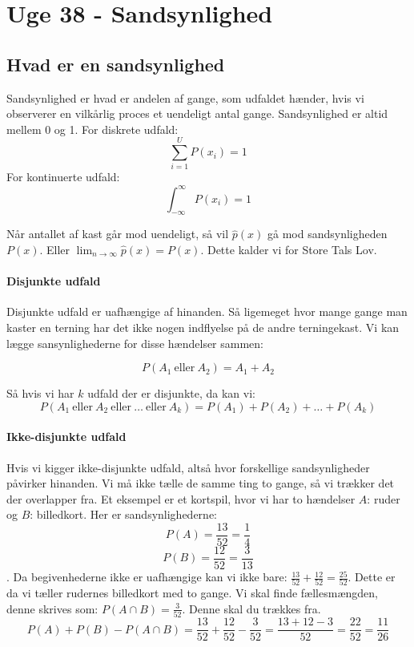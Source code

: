 \documentclass{article}
\begin{document}
    \newpage
\section{Uge 38 - Sandsynlighed}
\subsection{Hvad er en sandsynlighed}
Sandsynlighed er hvad er andelen af gange, som udfaldet hænder, hvis vi
observerer en vilkårlig proces et uendeligt antal gange. Sandsynlighed  er altid
mellem 0 og 1. For diskrete udfald:
$$\sum^U_{i=1} P(x_i) = 1 $$
For kontinuerte udfald:
$$\int^{\infty}_{-\infty} P(x_i) = 1 $$

Når antallet af kast går mod uendeligt, så vil $\hat{p}(x)$ gå mod
sandsynligheden $P(x)$. Eller $\lim_{n\rightarrow \infty} \hat{p}(x) = P(x)$.
Dette kalder vi for Store Tals Lov. 

\paragraph{Disjunkte udfald}
Disjunkte udfald er uafhængige af hinanden. Så ligemeget hvor mange gange man
kaster en terning har det ikke nogen indflyelse på de andre terningekast. Vi kan
lægge sansynlighederne for disse hændelser sammen:

$$P(A_1 \ \text{eller} \ A_2) = A_1 + A_2$$

Så hvis vi har $k$ udfald der er disjunkte, da kan vi:
$$P(A_1 \ \text{eller} \ A_2 \ \text{eller} \ \dots \ \text{eller} \ A_k) = P(A_1) + P(A_2) + \dots + P(A_k)$$
\paragraph{Ikke-disjunkte udfald}
Hvis vi kigger ikke-disjunkte udfald, altså hvor forskellige sandsynligheder
påvirker hinanden. Vi må ikke tælle de samme ting to gange, så vi trækker det
der overlapper fra. Et eksempel er et kortspil, hvor vi har to hændelser $A$:
ruder og $B$: billedkort. Her er sandsynlighederne: $$P(A)=\frac{13}{52} =
\frac{1}{4}$$ $$P(B) = \frac{12}{52} = \frac{3}{13}$$. Da begivenhederne ikke er
uafhængige kan vi ikke bare: $\frac{13}{52} + \frac{12}{52} = \frac{25}{52}$.
Dette er da vi tæller rudernes billedkort med to gange. Vi skal finde
fællesmængden, denne skrives som: $P(A \cap B) = \frac{3}{52}$. Denne skal du
trækkes fra. 
$$P(A) + P(B) - P(A\cap B) = \frac{13}{52} + \frac{12}{52} - \frac{3}{52} =
\frac{13+12-3}{52}=\frac{22}{52} = \frac{11}{26}$$
\end{document}
